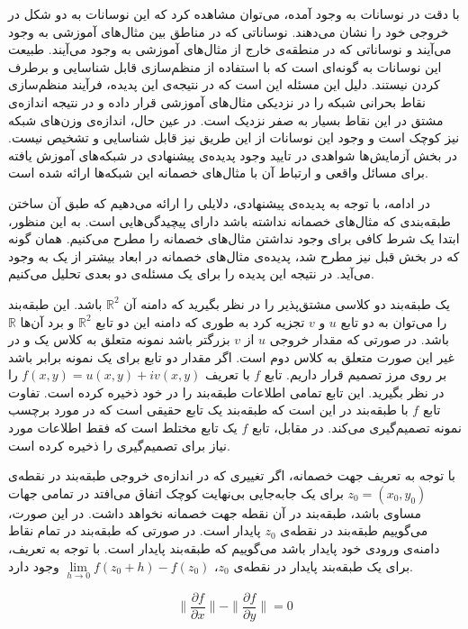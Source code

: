 \documentclass[12pt,onecolumn,a4paper]{article}
\begin{document}
با دقت در نوسانات به وجود آمده، می‌توان مشاهده کرد که این نوسانات به دو شکل در خروجی خود را نشان می‌دهند. نوساناتی که در مناطق بین مثال‌های آموزشی به وجود می‌آیند و نوساناتی که در منطقه‌ی خارج از مثال‌های آموزشی به وجود می‌آیند. طبیعت این نوسانات به گونه‌ای است که با استفاده از منظم‌سازی قابل شناسایی و برطرف کردن نیستند. دلیل این مسئله این است که در نتیجه‌ی این پدیده، فرآیند منظم‌سازی نقاط بحرانی شبکه را در نزدیکی مثال‌های آموزشی قرار داده و در نتیجه اندازه‌ی مشتق در این نقاط بسیار به صفر نزدیک است. در عین حال، اندازه‌ی وزن‌های شبکه نیز کوچک است و وجود این نوسانات از این طریق نیز قابل شناسایی و تشخیص نیست. در بخش آزمایش‌ها شواهدی در تایید وجود پدیده‌ی پیشنهادی در شبکه‌های آموزش یافته برای مسائل واقعی و ارتباط آن با مثال‌های خصمانه این شبکه‌ها ارائه شده است.

در ادامه، با توجه به پدیده‌ی پیشنهادی، دلایلی را ارائه می‌دهیم که طبق آن ساختن طبقه‌بندی که مثال‌های خصمانه نداشته باشد دارای پیچیدگی‌هایی است. به این منظور، ابتدا یک شرط کافی برای وجود نداشتن مثال‌های خصمانه را مطرح می‌کنیم. همان گونه که در بخش قبل نیز مطرح شد، پدیده‌ی مثال‌های خصمانه در ابعاد بیشتر از یک به وجود می‌آید. در نتیجه این پدیده را برای یک مسئله‌ی دو بعدی تحلیل می‌کنیم.

یک طبقه‌بند دو کلاسی مشتق‌پذیر را در نظر بگیرید که دامنه آن 
$\mathbb{R}^2$ 
باشد. این طبقه‌بند را می‌توان به دو تابع $u$ و $v$ 
تجزیه کرد به طوری که دامنه این دو تابع $\mathbb{R}^2$ 
و برد آن‌ها $\mathbb{R}$ 
باشد. در صورتی که مقدار خروجی $u$ از $v$ بزرگتر باشد نمونه متعلق به کلاس یک و در غیر این صورت متعلق به کلاس دوم است. اگر مقدار دو تابع برای یک نمونه برابر باشد بر روی مرز تصمیم قرار داریم. تابع $f$ 
با تعریف $f(x,y)=u(x,y)+iv(x,y)$ 
را در نظر بگیرید. این تابع تمامی اطلاعات طبقه‌بند را در خود ذخیره کرده است. تفاوت تابع $f$ 
با طبقه‌بند در این است که طبقه‌بند یک تابع حقیقی است که در مورد برچسب نمونه تصمیم‌گیری می‌کند. در مقابل، تابع $f$ 
یک تابع مختلط است که فقط اطلاعات مورد نیاز برای تصمیم‌گیری را ذخیره کرده است.

با توجه به تعریف جهت خصمانه، اگر تغییری که در اندازه‌ی خروجی طبقه‌بند در نقطه‌ی 
$z_0=(x_0,y_0)$ 
 برای یک جابه‌جایی بی‌نهایت کوچک اتفاق می‌افتد در تمامی جهات مساوی باشد، طبقه‌بند در آن نقطه جهت خصمانه نخواهد داشت. در این صورت، می‌گوییم طبقه‌بند در نقطه‌ی 
$z_0$ 
پایدار است. در صورتی که طبقه‌بند در تمام نقاط دامنه‌ی ورودی خود پایدار باشد می‌گوییم که طبقه‌بند پایدار است. با توجه به تعریف، برای یک طبقه‌بند پایدار در نقطه‌ی $z_0$، $\lim\limits_{h \to 0}f(z_0+h)-f(z_0)$ وجود دارد.

\begin{equation}
    \label{pdenorm}
    \|\frac{\partial f}{\partial x}\| - \|\frac{\partial f}{\partial y}\|=0
\end{equation}
\end{document}

